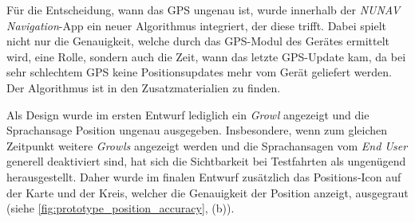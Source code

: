 Für die Entscheidung, wann das GPS ungenau ist, wurde innerhalb der \textit{NUNAV Navigation}-App ein neuer Algorithmus integriert, der diese trifft. Dabei spielt nicht nur die Genauigkeit, welche durch das GPS-Modul des Gerätes ermittelt wird, eine Rolle, sondern auch die Zeit, wann das letzte GPS-Update kam, da bei sehr schlechtem GPS keine Positionsupdates mehr vom Gerät geliefert werden. Der Algorithmus ist in den Zusatzmaterialien zu finden.

Als Design wurde im ersten Entwurf lediglich ein \textit{Growl} angezeigt und die Sprachansage \glqq Position ungenau\grqq{} ausgegeben. Insbesondere, wenn zum gleichen Zeitpunkt weitere \textit{Growls} angezeigt werden und die Sprachansagen vom \textit{End User} generell deaktiviert sind, hat sich die Sichtbarkeit bei Testfahrten als ungenügend herausgestellt. Daher wurde im finalen Entwurf zusätzlich das Positions-Icon auf der Karte und der Kreis, welcher die Genauigkeit der Position anzeigt, ausgegraut (siehe \autoref{fig:prototype_position_accuracy}, (b)).